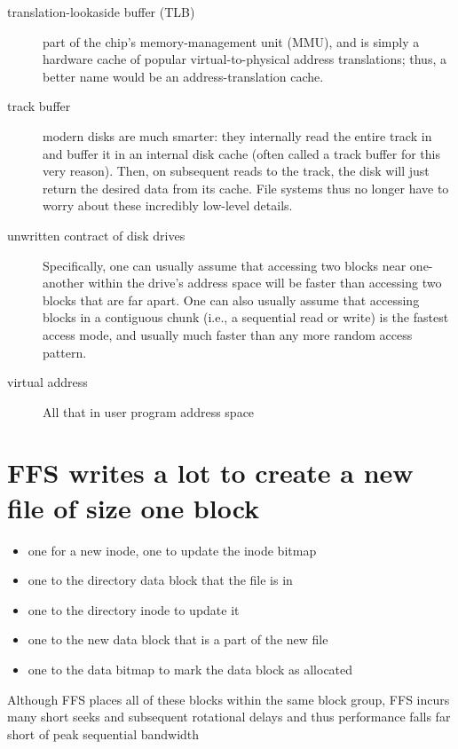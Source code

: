 \begin{description}
\item[translation-lookaside buffer (TLB)] part of the chip’s memory-management unit (MMU), and is simply a hardware cache of popular virtual-to-physical address translations; thus, a better name would be an address-translation cache.

\item[track buffer] modern disks are much smarter: they internally read the entire track in and buffer it in an internal disk cache (often called a track buffer for this very reason). Then, on subsequent reads to the track, the disk will just return the desired data from its cache. File systems thus no longer have to worry about these incredibly low-level details.


\item[unwritten contract of disk drives] Specifically, one can usually assume that accessing two blocks near one-another within the drive’s address space will be faster than accessing two blocks that are far apart. One can also usually assume that accessing blocks in a contiguous chunk (i.e., a sequential read or write) is the fastest access mode, and usually much faster than any more random access pattern.

\item[virtual address] All that in user program address space

\end{description}
\section*{FFS writes a lot to create a new file of size one block}
\begin{itemize}
\item one for a new inode, one to update the inode bitmap
\item one to the directory data block that the file is in
\item one to the directory inode to update it
\item one to the new data block that is a part of the new file
\item one to the data bitmap to mark the data block as allocated
\end{itemize}
Although FFS places all of these blocks within the same block group, FFS incurs many short seeks and subsequent rotational delays and thus performance falls far short of peak sequential bandwidth
